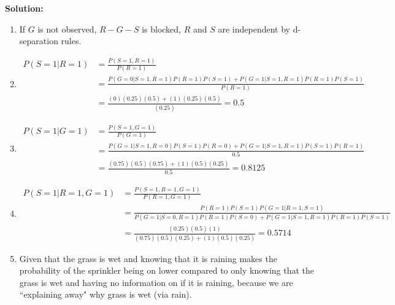 \documentclass[submit]{harvardml}
\newcommand{\attr}[1]{\textsf{#1}}
\begin{document}
\textbf{Solution:}
\begin{enumerate}
    \item 
    If $G$ is not observed, $R - G - S$ is blocked, $R$ and $S$ are independent by d-separation rules.
    \begin{center}
    \end{center}
    
    \item 
    \begin{align}
        P(S = 1 | R = 1) &= \frac{P(S=1, R=1)}{P(R=1)} \\
        &= \frac{P(G=0 | S=1, R=1)P(R=1)P(S=1) + P(G=1 | S=1, R=1)P(R=1)P(S=1)}{P(R=1)} \\
        &= \frac{(0)(0.25)(0.5) + (1)(0.25)(0.5)}{(0.25)} = 0.5
    \end{align} 
    
    \item 
    \begin{align}
        P(S=1 | G=1) &= \frac{P(S=1, G=1)}{P(G=1)} \\
        &= \frac{P(G=1 | S=1, R=0)P(S=1)P(R=0) + P(G=1 | S=1, R=1)P(S=1)P(R=1)}{0.5} \\
        &= \frac{(0.75)(0.5)(0.75) + (1)(0.5)(0.25)}{0.5} = 0.8125
    \end{align}
    
    
    \item
    \begin{align}
        P(S=1 | R=1, G=1) &= \frac{P(S=1, R=1, G=1)}{P(R=1, G=1)} \\
        &= \frac{P(R=1)P(S=1)P(G=1|R=1, S=1)}{P(G=1 | S=0, R=1)P(R=1)P(S=0) + P(G=1 | S=1, R=1)P(R=1)P(S=1)} \\
        &= \frac{(0.25)(0.5)(1)}{(0.75)(0.5)(0.25) + (1)(0.5)(0.25)} = 0.5714 
    \end{align}
    
    \item Given that the grass is wet and knowing that it is raining makes the probability of the sprinkler being on lower compared to only knowing that the grass is wet and having no information on if it is raining, because we are ``explaining away" why grass is wet (via rain).
    

\end{enumerate}
\end{document}
